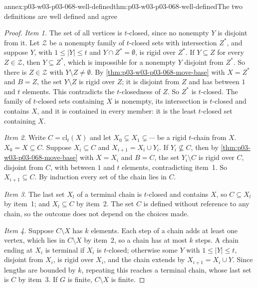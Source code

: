 \begin{annexitem}{annex:p03-w03-p03-068-well-defined}{thm:p03-w03-p03-068-well-defined}{The two definitions are well defined and agree}
\begin{proof}
\emph{Item 1.}  The set of all vertices is \(t\)-closed, since no nonempty
\(Y\) is disjoint from it.  Let \(\mathcal Z\) be a nonempty family of
\(t\)-closed sets with intersection \(Z^*\), and suppose \(Y\), with
\(1\leq|Y|\leq t\) and \(Y\cap Z^*=\emptyset\), is rigid over \(Z^*\).  If
\(Y\subseteq Z\) for every \(Z\in\mathcal Z\), then \(Y\subseteq Z^*\), which
is impossible for a nonempty \(Y\) disjoint from \(Z^*\).  So there is
\(Z\in\mathcal Z\) with \(Y\setminus Z\neq\emptyset\).  By
\cref{thm:p03-w03-p03-068-move-base} with \(X=Z^*\) and \(B=Z\), the set
\(Y\setminus Z\) is rigid over \(Z\); it is disjoint from \(Z\) and has between
\(1\) and \(t\) elements.  This contradicts the \(t\)-closedness of \(Z\).  So
\(Z^*\) is \(t\)-closed.  The family of \(t\)-closed sets containing \(X\) is
nonempty, its intersection is \(t\)-closed and contains \(X\), and it is
contained in every member: it is the least \(t\)-closed set containing \(X\).

\emph{Item 2.}  Write \(C=\mathrm{cl}_t(X)\) and let
\(X_0\subsetneq X_1\subsetneq\cdots\) be a rigid \(t\)-chain from \(X\).
\(X_0=X\subseteq C\).  Suppose \(X_i\subseteq C\) and
\(X_{i+1}=X_i\cup Y_i\).  If \(Y_i\not\subseteq C\), then by
\cref{thm:p03-w03-p03-068-move-base} with \(X=X_i\) and \(B=C\), the set
\(Y_i\setminus C\) is rigid over \(C\), disjoint from \(C\), with between \(1\)
and \(t\) elements, contradicting item~1.  So \(X_{i+1}\subseteq C\).  By
induction every set of the chain lies in \(C\).

\emph{Item 3.}  The last set \(X_l\) of a terminal chain is \(t\)-closed and
contains \(X\), so \(C\subseteq X_l\) by item~1; and \(X_l\subseteq C\) by
item~2.  The set \(C\) is defined without reference to any chain, so the
outcome does not depend on the choices made.

\emph{Item 4.}  Suppose \(C\setminus X\) has \(k\) elements.  Each step of a
chain adds at least one vertex, which lies in \(C\setminus X\) by item~2, so a
chain has at most \(k\) steps.  A chain ending at \(X_i\) is terminal if
\(X_i\) is \(t\)-closed; otherwise some \(Y\) with \(1\leq|Y|\leq t\),
disjoint from \(X_i\), is rigid over \(X_i\), and the chain extends by
\(X_{i+1}=X_i\cup Y\).  Since lengths are bounded by \(k\), repeating this
reaches a terminal chain, whose last set is \(C\) by item~3.  If \(G\) is
finite, \(C\setminus X\) is finite.


\end{proof}
\end{annexitem}
